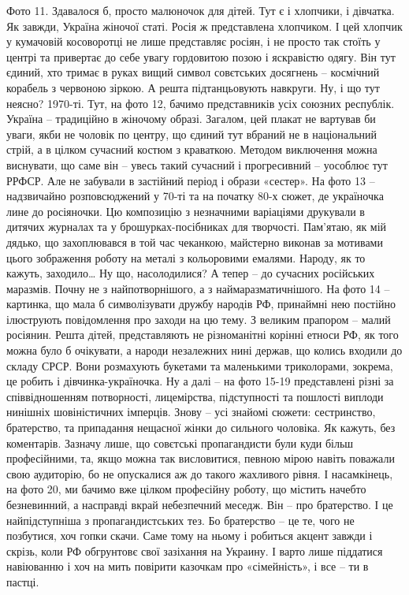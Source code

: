 Фото 11. Здавалося б, просто малюночок для дітей. Тут є і хлопчики, і дівчатка. Як завжди, Україна жіночої статі. Росія ж представлена хлопчиком. І цей хлопчик у кумачовій косоворотці не лише представляє росіян, і не просто так стоїть у центрі та привертає до себе увагу гордовитою позою і яскравістю одягу. Він тут єдиний, хто тримає в руках вищий символ совєтських досягнень – космічний корабель з червоною зіркою. А решта підтанцьовують навкруги. Ну, і що тут неясно?
1970-ті. Тут, на фото 12, бачимо представників усіх союзних республік. Україна – традиційно в жіночому образі. Загалом, цей плакат не вартував би уваги, якби не чоловік по центру, що єдиний тут вбраний не в національний стрій, а в цілком сучасний костюм з краваткою. Методом виключення можна виснувати, що саме він – увесь такий сучасний і прогресивний –  уособлює тут РРФСР. 
Але не забували в застійний період і образи «сестер». На фото 13 – надзвичайно розповсюджений у 70-ті та на початку 80-х сюжет, де україночка лине до росіяночки. Цю композицію з незначними варіаціями друкували в дитячих журналах та у брошурках-посібниках для творчості. Пам’ятаю, як мій дядько, що захоплювався в той час чеканкою, майстерно виконав за мотивами цього зображення роботу на металі з кольоровими емалями. Народу, як то кажуть, заходило… 
Ну що, насолодилися? А тепер – до сучасних російських маразмів. 
Почну не з найпотворнішого, а з наймаразматичнішого. На фото 14 – картинка, що мала б символізувати дружбу народів РФ, принаймні нею постійно ілюструють повідомлення про заходи на цю тему. З великим прапором – малий росіянин. Решта дітей, представляють не різноманітні корінні етноси РФ, як того можна було б очікувати, а народи незалежних нині держав, що колись входили до складу СРСР. Вони розмахують букетами та маленькими триколорами, зокрема, це робить і дівчинка-україночка.
Ну а далі – на фото 15-19 представлені різні за співвідношенням потворності, лицемірства, підступності та пошлості виплоди нинішніх шовіністичних імперців. Знову – усі знайомі сюжети:   сестринство, братерство, та припадання нещасної жінки до сильного чоловіка. Як кажуть, без коментарів. Зазначу лише, що совєтські пропагандисти були куди більш професійними, та, якщо можна так висловитися, певною мірою навіть поважали свою аудиторію, бо не опускалися аж до такого жахливого рівня. 
І насамкінець, на фото 20, ми бачимо вже цілком професійну роботу, що містить начебто безневинний, а насправді вкрай небезпечний меседж. Він – про братерство. І це найпідступніша з пропагандистських тез. Бо братерство – це те, чого не позбутися, хоч гопки скачи. Саме тому на ньому і робиться акцент завжди і скрізь, коли РФ обгрунтовє свої зазіхання на Украину. І варто лише піддатися навіюванню і хоч на мить повірити казочкам про «сімейність», і все – ти в пастці. 
